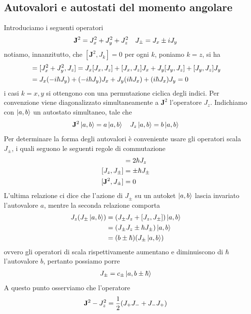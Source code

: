 \documentclass{article}
\begin{document}
\subsection{Autovalori e autostati del momento angolare}
Introduciamo i seguenti operatori
\begin{gather}
    \mathbf{J}^2 = J_x^2 + J_y^2 + J_z^2 \quad J_\pm = J_x \pm iJ_y \notag
\end{gather}
notiamo, innanzitutto, che $[\mathbf{J}^2, J_k] = 0$ per ogni $k$, poniamo $k = z$, si ha
\begin{align}
    [\mathbf{J}^2, J_z] &= [J_x^2 + J_y^2, J_z] = J_x[J_x, J_z] + [J_x, J_z]J_x + J_y[J_y, J_z] + [J_y, J_z]J_y \notag \\
    &= J_x(-i\hbar J_y) + (-i\hbar J_y)J_x + J_y(i\hbar J_x) + (i\hbar J_x)J_y = 0 \notag
\end{align}
i casi $k = x, y$ si ottengono con una permutazione ciclica degli indici. Per convenzione viene diagonalizzato simultaneamente a $\mathbf{J}^2$ l'operatore $J_z$. Indichiamo con $\ket{a, b}$ un autostato simultaneo, tale che
\begin{gather}
    \mathbf{J}^2\ket{a, b} = a\ket{a, b} \quad J_z\ket{a, b} = b\ket{a, b} \notag
\end{gather}
Per determinare la forma degli autovalori è conveniente usare gli operatori scala $J_\pm$, i quali seguono le seguenti regole di commutazione
\begin{align}
    [J_+, J_-] &= 2\hbar J_z \notag \\
    [J_z, J_\pm] &= \pm \hbar J_\pm \notag \\
    [\mathbf{J}^2, J_\pm] &= 0 \notag
\end{align}
L'ultima relazione ci dice che l'azione di $J_\pm$ su un autoket $\ket{a, b}$ lascia invariato l'autovalore $a$, mentre la seconda relazione comporta
\begin{align}
    J_z(J_\pm\ket{a, b}) &= (J_\pm J_z + [J_z, J_\pm])\ket{a, b} \notag \\
    &= (J_\pm J_z \pm \hbar J_\pm)\ket{a, b} \notag \\
    &= (b \pm \hbar)(J_\pm\ket{a, b}) \notag
\end{align}
ovvero gli operatori di scala rispettivamente aumentano e diminuiscono di $\hbar$ l'autovalore $b$, pertanto possiamo porre
\begin{gather}
    J_\pm = c_\pm \ket{a, b \pm \hbar} \notag 
\end{gather}
A questo punto osserviamo che l'operatore
\begin{gather}
    \mathbf{J}^2 - J_z^2 = \frac{1}{2}(J_+J_- + J_-J_+) \notag
\end{gather}
\end{document}
